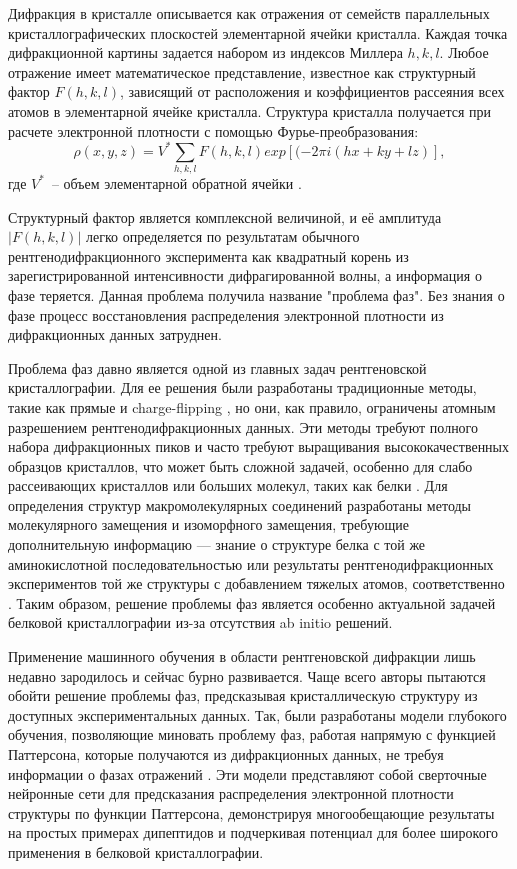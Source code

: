 \documentclass[a4paper,12pt]{article}
\begin{document}
{Дифракция в кристалле описывается как отражения от семейств параллельных кристаллографических плоскостей элементарной ячейки кристалла. Каждая точка дифракционной картины задается набором из индексов Миллера $h,k,l$. Любое отражение имеет математическое представление, известное как структурный фактор $F(h,k,l)$, зависящий от расположения и коэффициентов рассеяния всех
атомов в элементарной ячейке кристалла. Структура кристалла получается при расчете электронной плотности с помощью Фурье-преобразования: \[\rho(x, y, z) = V^*\sum_{h,k,l} F(h,k,l) exp[(-2\pi i (hx+ky+lz)],\] где $V^*$~-- объем элементарной обратной ячейки \cite{giro}. 

Структурный фактор является комплексной величиной, и её амплитуда  $|F(h,k,l)|$ легко определяется по результатам обычного рентгенодифракционного эксперимента как квадратный корень из зарегистрированной интенсивности дифрагированной волны, а информация о фазе теряется. Данная проблема получила название "проблема фаз". Без знания о фазе процесс восстановления распределения электронной плотности из дифракционных данных затруднен.

Проблема фаз давно является одной из главных задач рентгеновской кристаллографии. Для ее решения были разработаны традиционные методы, такие как прямые \cite{direct} и charge-flipping \cite{charge_flipping}, но они, как правило, ограничены атомным разрешением рентгенодифракционных данных. Эти методы требуют полного набора дифракционных пиков и часто требуют выращивания высококачественных образцов кристаллов, что может быть сложной задачей, особенно для слабо рассеивающих кристаллов или больших молекул, таких как белки \cite{protein_crystallography}. Для определения структур макромолекулярных соединений разработаны методы молекулярного замещения и изоморфного замещения, требующие дополнительную информацию --- знание о структуре белка с той же аминокислотной последовательностью или результаты рентгенодифракционных экспериментов той же структуры с добавлением тяжелых атомов, соответственно \cite{acta}. Таким образом, решение проблемы фаз является особенно актуальной задачей белковой кристаллографии из-за отсутствия ab initio решений. 

Применение машинного обучения в области рентгеновской дифракции лишь недавно зародилось и сейчас бурно развивается. Чаще всего авторы пытаются обойти решение проблемы фаз, предсказывая кристаллическую структуру из доступных экспериментальных данных. Так, были разработаны модели глубокого обучения, позволяющие миновать проблему фаз, работая напрямую с функцией Паттерсона, которые получаются из дифракционных данных, не требуя информации о фазах отражений \cite{patterson}. Эти модели представляют собой сверточные нейронные сети для предсказания распределения электронной плотности структуры по функции Паттерсона, демонстрируя многообещающие результаты на простых примерах дипептидов и подчеркивая потенциал для более широкого применения в белковой кристаллографии.

}
\end{document}
